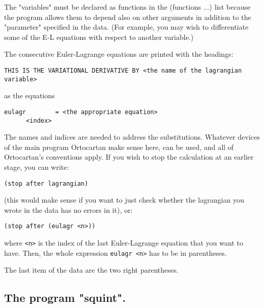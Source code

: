 \bigskip

\noindent The "variables" must be declared as functions in the (functions ...)
list because the program allows them to depend also on other arguments in
addition to the "parameter" specified in the data. (For example, you may wish
to differentiate some of the E-L equations with respect to another variable.)

The consecutive Euler-Lagrange equations are printed with the headings:

\bigskip

\begin{verbatim}
THIS IS THE VARIATIONAL DERIVATIVE BY <the name of the lagrangian variable>
\end{verbatim}

\bigskip

\noindent as the equations
\bigskip

\begin{verbatim}
eulagr        = <the appropriate equation>
      <index>
\end{verbatim}

\bigskip

\noindent The names and indices are needed to address the substitutions.
Whatever devices of the main program Ortocartan make sense here, can be used,
and all of Ortocartan's conventions apply. If you wish to stop the calculation
at an earlier stage, you can write:

\bigskip

\begin{verbatim}
(stop after lagrangian)
\end{verbatim}

\bigskip

\noindent (this would make sense if you want to just check whether the
lagrangian you wrote in the data has no errors in it), or:

\bigskip

\begin{verbatim}
(stop after (eulagr <n>))
\end{verbatim}

\bigskip

\noindent where \verb+<n>+ is the index of the last Euler-Lagrange equation
that you want to have. Then, the whole expression \verb+eulagr <n>+ has to be
in parentheses.

The last item of the data are the two right parentheses.

\subsection{The program "squint".}

